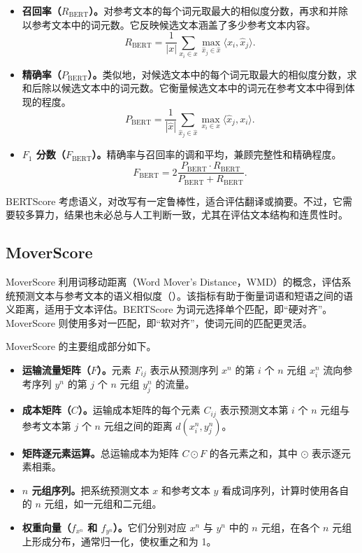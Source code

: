 \begin{itemize}
\item \textbf{召回率（$R_{\mathrm{BERT}}$）。}对参考文本的每个词元取最大的相似度分数，再求和并除以参考文本中的词元数。它反映候选文本涵盖了多少参考文本内容。
\begin{equation}
R_{\mathrm{BERT}}=\frac{1}{|x|}\sum_{x_i\in x}
 \max_{\widehat{x}_j\in\widehat{x}}\langle x_i,\widehat{x}_j\rangle.
\label{eq:ch08-bert-recall}
\end{equation}
\item \textbf{精确率（$P_{\mathrm{BERT}}$）。}类似地，对候选文本中的每个词元取最大的相似度分数，求和后除以候选文本中的词元数。它衡量候选文本中的词元在参考文本中得到体现的程度。
\begin{equation}
P_{\mathrm{BERT}}=\frac{1}{|\widehat{x}|}\sum_{\widehat{x}_j\in\widehat{x}}
 \max_{x_i\in x}\langle\widehat{x}_j,x_i\rangle.
\label{eq:ch08-bert-precision}
\end{equation}
\item \textbf{$F_1$ 分数（$F_{\mathrm{BERT}}$）。}精确率与召回率的调和平均，兼顾完整性和精确程度。
\begin{equation}
F_{\mathrm{BERT}}=2\frac{P_{\mathrm{BERT}}\cdot R_{\mathrm{BERT}}}
 {P_{\mathrm{BERT}}+R_{\mathrm{BERT}}}.
\label{eq:ch08-bert-f1}
\end{equation}
\end{itemize}

BERTScore 考虑语义，对改写有一定鲁棒性，适合评估翻译或摘要。不过，它需要较多算力，结果也未必总与人工判断一致，尤其在评估文本结构和连贯性时。

\subsection{MoverScore}
MoverScore 利用词移动距离（Word Mover's Distance，WMD）的概念，评估系统预测文本与参考文本的语义相似度（）。该指标有助于衡量词语和短语之间的语义距离，适用于文本评估。BERTScore 为词元选择单个匹配，即“硬对齐”。MoverScore 则使用多对一匹配，即“软对齐”，使词元间的匹配更灵活。

MoverScore 的主要组成部分如下。

\begin{itemize}
\item \textbf{运输流量矩阵（$F$）。}元素 $F_{ij}$ 表示从预测序列 $x^n$ 的第 $i$ 个 $n$ 元组 $x_i^n$ 流向参考序列 $y^n$ 的第 $j$ 个 $n$ 元组 $y_j^n$ 的流量。
\item \textbf{成本矩阵（$C$）。}运输成本矩阵的每个元素 $C_{ij}$ 表示预测文本第 $i$ 个 $n$ 元组与参考文本第 $j$ 个 $n$ 元组之间的距离 $d(x_i^n,y_j^n)$。
\item \textbf{矩阵逐元素运算。}总运输成本为矩阵 $C\odot F$ 的各元素之和，其中 $\odot$ 表示逐元素相乘。
\item \textbf{$n$ 元组序列。}把系统预测文本 $x$ 和参考文本 $y$ 看成词序列，计算时使用各自的 $n$ 元组，如一元组和二元组。
\item \textbf{权重向量（$f_{x^n}$ 和 $f_{y^n}$）。}它们分别对应 $x^n$ 与 $y^n$ 中的 $n$ 元组，在各个 $n$ 元组上形成分布，通常归一化，使权重之和为 1。
\end{itemize}

